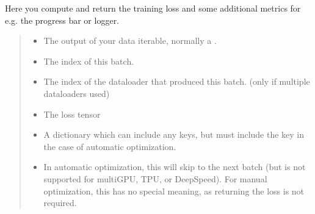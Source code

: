 \documentclass[letterpaper,10pt,english]{sphinxmanual}
\begin{document}
\begin{fulllineitems}

\begin{fulllineitems}
\label{\detokenize{train:train.PcrCNN.training_step}}
\pysigstartsignatures
\pysiglinewithargsret
{}
{\sphinxparamcomma {}}
{}
\pysigstopsignatures
\sphinxAtStartPar
Here you compute and return the training loss and some additional metrics for e.g. the progress bar or
logger.
\begin{quote}\begin{description}
\begin{itemize}
\item {} 
\sphinxAtStartPar
{} \textendash{} The output of your data iterable, normally a .

\item {} 
\sphinxAtStartPar
{} \textendash{} The index of this batch.

\item {} 
\sphinxAtStartPar
{} \textendash{} The index of the dataloader that produced this batch.
(only if multiple dataloaders used)

\end{itemize}

\sphinxAtStartPar
\begin{itemize}
\item {} 
\sphinxAtStartPar
{} \sphinxhyphen{} The loss tensor

\item {} 
\sphinxAtStartPar
{} \sphinxhyphen{} A dictionary which can include any keys, but must include the key  in the case of
automatic optimization.

\item {} 
\sphinxAtStartPar
{} \sphinxhyphen{} In automatic optimization, this will skip to the next batch (but is not supported for
multi\sphinxhyphen{}GPU, TPU, or DeepSpeed). For manual optimization, this has no special meaning, as returning
the loss is not required.


\end{itemize}
\end{description}
\end{quote}
\end{fulllineitems}
\end{fulllineitems}
\end{document}
